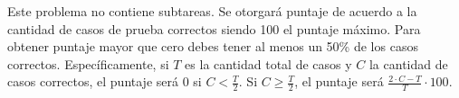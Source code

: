 \documentclass{oci}
\begin{document}
\begin{scoreDescription}
  Este problema no contiene subtareas.
  Se otorgará puntaje de acuerdo a la cantidad de casos de prueba correctos siendo
  100 el puntaje máximo.
  Para obtener puntaje mayor que cero debes tener al menos un 50\% de los casos
  correctos.
  Específicamente, si $T$ es la cantidad total de casos y $C$ la cantidad de casos correctos,
  el puntaje será 0 si $C < \frac{T}{2}$.
  Si $C \geq \frac{T}{2}$, el puntaje será $\frac{2\cdot C - T}{T}\cdot 100$.
\end{scoreDescription}

\begin{sampleDescription}
\end{sampleDescription}
\end{document}
